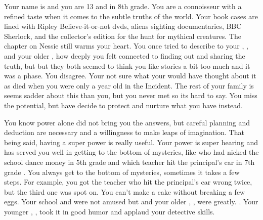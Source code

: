 \documentclass[char]{LRSguildcamp1}
\begin{document}
\name{\cTween{}}



Your name is \cTween{\intro} and you are 13 and in 8th grade. You are a connoisseur with a refined taste when it comes to the subtle truths of the world. Your book cases are lined with Ripley Believe-it-or-not dvds, aliens sighting documentaries,  BBC Sherlock, and the collector's edition for the hunt for mythical creatures. The chapter on Nessie still warms your heart. You once tried to describe to your \cArchitect{\parent}, \cArchitect{}, and your older \cTeen{\sibling}, \cTeen{} how deeply you felt connected to finding out and sharing the truth, but but they both seemed to think you like stories a bit too much and it was a phase. You disagree. Your not sure what your \cAS{\parent} would have thought about it as \cAS{\they} died when you were only a year old in the \pCityO{} Incident. The rest of your family is seems sadder about this than you, but you never met \cAS{\them} so its hard to say. You miss the potential, but have decide to protect and nurture what you have instead.


You know power alone did not bring you the answers, but careful planning and deduction are necessary and a willingness to make leaps of imagination. That being said, having a super power is really useful. Your power is super hearing and has served you well in getting to the bottom of mysteries, like who had nicked the school dance money in 5th grade and which teacher hit the principal's car in 7th grade . You always get to the bottom of mysteries, sometimes it takes a few steps. For example, you got the teacher who hit the principal's car wrong twice, but the third one was spot on. You can't make a cake without breaking a few eggs. Your school and \cArchitect{\parent} were not amused but \cGrandma{} and your older \cOldest{\uncle}, \cOldest{}, were greatly. \cYoungest{}. Your younger , \cYoungest{}, took it in good humor and applaud your detective skills.
\end{document}
